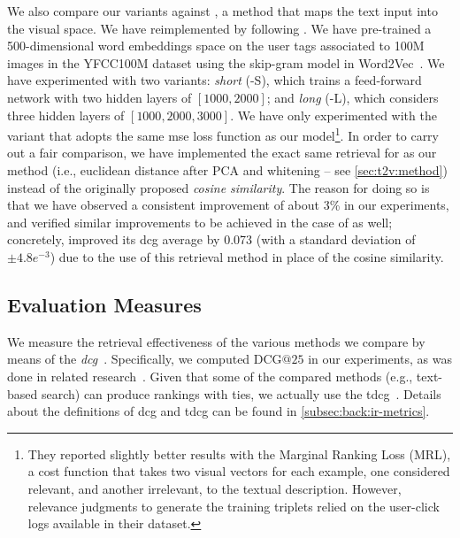 We also compare our \ttv{} variants against \wordvisual{} \cite{dong2018predicting}, a method that maps the text input into the visual space. %
We have reimplemented \wordvisual{} by following \cite{dong2018predicting}.
We have pre-trained a 500-dimensional word embeddings space on the user tags associated to 100M images in the YFCC100M dataset \cite{thomee2016yfcc100m} using the skip-gram model in Word2Vec~\cite{mikolov2013distributed}.
We have experimented with two variants: \emph{short} (\wordvisual{}-S), which trains a feed-forward network with two hidden layers of $[1000, 2000]$; and \emph{long} (\wordvisual{}-L), which considers three hidden layers of $[1000, 2000, 3000]$.
We have only experimented with the variant that adopts the same \gls{mse} loss function as our model\footnote{They reported slightly better results with the Marginal Ranking Loss (MRL), a cost function that takes two visual vectors for each example, one considered relevant, and another irrelevant, to the textual description. However, relevance judgments to generate the training triplets relied on the user-click logs available in their dataset.}. %
In order to carry out a fair comparison, we have implemented the exact same retrieval for \wordvisual{} as our method (i.e.,  euclidean distance after PCA and whitening -- see \ref{sec:t2v:method}) instead of the originally proposed \emph{cosine similarity}.
The reason for doing so is that we have observed a consistent improvement of about 3\% in our experiments, and verified similar improvements to be achieved in the case of \wordvisual{} as well;
concretely, \wordvisual{} improved its \gls{dcg} average by 0.073 (with a standard deviation of $\pm4.8e^{-3}$) due to the use of this retrieval method in place of the cosine similarity.

\subsection{Evaluation Measures}
\label{subsec:t2v:eval}

We measure the retrieval effectiveness of the various methods we compare by means of the \emph{\acrfull{dcg}}~\cite{jarvelin2002cumulated}.
%
%
Specifically, we computed $\mathrm{DCG}@25$ in our experiments, as was done in related research~\cite{hua2013clickage,dong2018predicting}.
Given that some of the compared methods (e.g., text-based search) can produce rankings with ties, we actually use the \gls{tdcg}~\cite{mcsherry2008computing}.
Details about the definitions of \gls{dcg} and \gls{tdcg} can be found in \ref{subsec:back:ir-metrics}.

